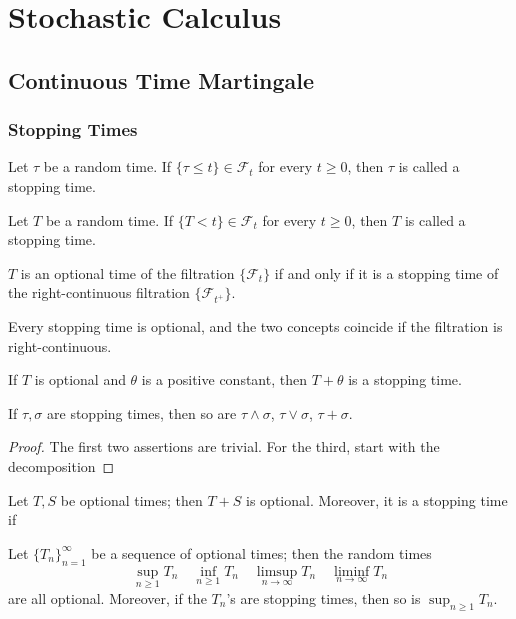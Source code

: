 \chapter{Stochastic Calculus}


\section{Continuous Time Martingale}
\subsection{Stopping Times}
\begin{definition}
    Let $\tau$ be a random time. If $\{\tau\leq t\}\in\mathcal{F}_t$ for every $t\geq 0$,
    then $\tau$ is called a stopping time.
\end{definition}
\begin{definition}
    Let $T$ be a random time. If $\{T<t\}\in\mathcal{F}_t$ for every $t\geq 0$,
    then $T$ is called a stopping time.
\end{definition}
\begin{lemma}
    $T$ is an optional time of the filtration $\{\mathcal{F}_t\}$ if and only if it is a stopping time of the right-continuous
    filtration $\{\mathcal{F}_{t^+}\}$.
\end{lemma}
\begin{corollary}
    Every stopping time is optional, and the two concepts coincide if the filtration is right-continuous.
\end{corollary}
\begin{lemma}
    If $T$ is optional and $\theta$ is a positive constant, then $T+\theta$ is a stopping time.
\end{lemma}
\begin{lemma}
    If $\tau,\sigma$ are stopping times, then so are $\tau\wedge \sigma$, $\tau\vee \sigma$, $\tau+\sigma$.
\end{lemma}
\begin{proof}
    The first two assertions are trivial. \newline 
    For the third, start with the decomposition
\end{proof}
\begin{lemma}
    Let $T,S$ be optional times; then $T+S$ is optional. \newline
    Moreover, it is a stopping time if
\end{lemma}
\begin{lemma}
    Let $\{T_n\}_{n=1}^\infty$ be a sequence of optional times; then the random times 
    \[\sup_{n\geq 1}T_n\quad \inf_{n\geq 1}T_n\quad \limsup_{n\to\infty}T_n\quad \liminf_{n\to\infty}T_n \] 
    are all optional.\newline 
    Moreover, if the $T_n$'s are stopping times, then so is $\sup_{n\geq 1}T_n$.
\end{lemma}


